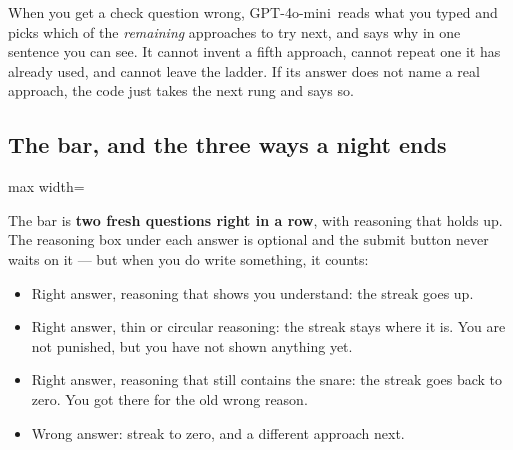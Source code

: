 \documentclass[11pt]{article}
\newcommand{\themodel}{GPT-4o-mini}
\begin{document}
\vspace{0.3em}
When you get a check question wrong, \themodel\ reads what you typed and picks
which of the \emph{remaining} approaches to try next, and says why in one
sentence you can see. It cannot invent a fifth approach, cannot repeat one it
has already used, and cannot leave the ladder. If its answer does not name a
real approach, the code just takes the next rung and says so.

\subsection{The bar, and the three ways a night ends}

\begin{center}
\begin{adjustbox}{max width=\textwidth}
\end{adjustbox}
\end{center}

\vspace{0.2em}
The bar is \textbf{two fresh questions right in a row}, with reasoning that
holds up. The reasoning box under each answer is optional and the submit button
never waits on it --- but when you do write something, it counts:

\begin{itemize}
  \item Right answer, reasoning that shows you understand: the streak goes up.
  \item Right answer, thin or circular reasoning: the streak stays where it is.
        You are not punished, but you have not shown anything yet.
  \item Right answer, reasoning that still contains the snare: the streak goes
        back to zero. You got there for the old wrong reason.
  \item Wrong answer: streak to zero, and a different approach next.
\end{itemize}
\end{document}

